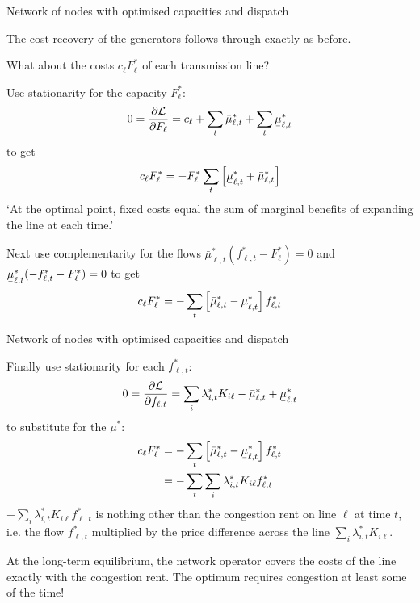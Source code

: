 \documentclass[10pt,aspectratio=169,dvipsnames]{beamer}
\def\l{\lambda}
\def\m{\mu}
\def\d{\partial}
\def\cL{\mathcal{L}}
\newcommand{\ubar}[1]{\text{\b{$#1$}}}
\begin{document}
\begin{frame}{Network of nodes with optimised capacities and dispatch}

  The cost recovery of the generators follows through exactly as before.

  What about the costs $c_\ell F_\ell^*$ of each transmission line?


  Use stationarity for the capacity $F_{\ell}^*$:
    \begin{align*}
        0 = \frac{\d \cL}{\d F_{\ell}}  = c_\ell   +\sum_t \bar{\m}^*_{\ell,t}  + \sum_t \ubar{\m}^*_{\ell,t}
    \end{align*}
    to get
    \begin{align*}
      c_\ell F_\ell^* = - F_\ell^* \sum_t \left[ \ubar{\m}^*_{\ell,t} +  \bar{\m}^*_{\ell,t} \right]
    \end{align*}
   `At the optimal point, fixed costs equal the sum of marginal
    benefits of expanding the line at each time.'


  Next use complementarity for the flows $\bar{\m}_{\ell,t}^* ( f_{\ell,t}^* - F_\ell^*) = 0$ and $\ubar{\m}_{\ell,t}^* ( - f_{\ell,t}^* - F_\ell^*) = 0$ to get
    \begin{align*}
      c_\ell F_\ell^* =  -\sum_t \left[ \bar{\m}^*_{\ell,t} -  \ubar{\m}^*_{\ell,t} \right] f_{\ell,t}^*
    \end{align*}

\end{frame}


\begin{frame}{Network of nodes with optimised capacities and dispatch}

  Finally use stationarity for each $f_{\ell,t}^*$:
    \begin{align*}
        0 = \frac{\d \cL}{\d f_{\ell,t}}  = \sum_i \l_{i,t}^*K_{i\ell}  - \bar{\m}^*_{\ell,t} + \ubar{\m}^*_{\ell,t}
  \end{align*}
    to substitute for the $\m^*$:
    \begin{align*}
      c_\ell F_\ell^*  &=  -\sum_t \left[ \bar{\m}^*_{\ell,t} -  \ubar{\m}^*_{\ell,t}   \right] f_{\ell,t}^* \\
      & =-\sum_t \sum_i \l_{i,t}^*K_{i\ell} f_{\ell,t}^*
    \end{align*}
    $ -\sum_i \l_{i,t}^*K_{i\ell} f_{\ell,t}^*$ is nothing other than
    the \alert{congestion rent} on line $\ell$ at time $t$, i.e. the flow $f_{\ell,t}^*$ multiplied by the price difference across the line $\sum_i \l_{i,t}^*K_{i\ell}$.

    At the long-term equilibrium, the network operator covers the costs of the line exactly with the congestion rent. The optimum requires congestion at least some of the time!
\end{frame}
\end{document}
